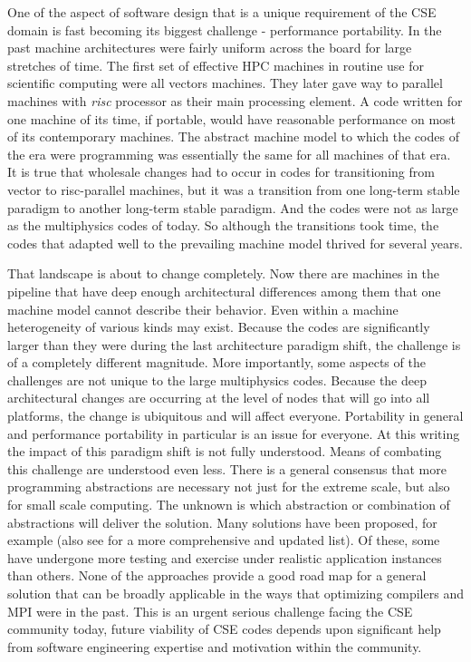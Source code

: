 \label{sec:future}

One of the aspect of software design that is a unique requirement of
the CSE domain is fast becoming its biggest challenge - performance
portability. In the past machine architectures were fairly uniform
across the board for large stretches of time. The first set of
effective HPC machines in routine use for scientific computing were
all vectors machines. They later gave way to parallel machines with
{\em risc} processor as their main processing element. A code written
for one machine of its time, if portable, would have reasonable
performance on most of its contemporary machines. The abstract machine
model to which the codes of the era were programming was essentially
the same for all machines of that era. It is true that wholesale changes had to occur
in codes for transitioning from vector to risc-parallel machines, but
it was a transition from one long-term stable paradigm to another
long-term stable paradigm. And the codes were not as large as the
multiphysics codes of today. So although the transitions took time, the
codes that adapted well to the prevailing machine model thrived for
several years.  

That landscape is about to change completely. Now there are machines
in the pipeline that have deep enough architectural differences among
them that one machine model cannot describe their behavior. Even
within a machine heterogeneity of various kinds may exist. Because
the codes are significantly larger than they were during the last
architecture paradigm shift, the challenge is of a
completely different magnitude. More importantly, some aspects of the
challenges are not unique to the large multiphysics codes. Because the
deep architectural changes are occurring at the level of nodes that
will go into all platforms, the change is ubiquitous and will
affect everyone. Portability in general and performance
portability in particular is an issue for everyone. At this writing
the impact of this paradigm shift is not fully understood. Means of
combating this challenge are understood even less. There is a general
consensus that more programming abstractions are necessary not just
for the extreme scale, but also for small scale computing. The unknown
is which abstraction or combination of abstractions will deliver the
solution. Many solutions have been proposed, for example \cite{PADAL14} (also
see \cite{IDEAS} for a more comprehensive and updated
list). Of these, some have undergone more testing and exercise under
realistic application instances than others. None of the approaches
provide a good road map for a general solution that can be broadly
applicable in the ways that optimizing compilers and MPI were
in the past. This is an urgent serious challenge facing the CSE
community today, future viability of CSE codes depends upon
significant help from software engineering expertise and motivation
within the community. 

